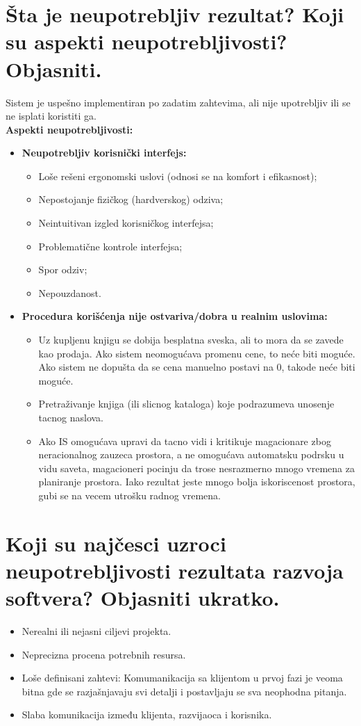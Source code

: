 \documentclass[a4paper]{article}
\begin{document}
\section{Šta je neupotrebljiv rezultat? Koji su aspekti neupotrebljivosti? Objasniti.}
  Sistem je uspešno implementiran po zadatim zahtevima, ali nije upotrebljiv ili se ne isplati
  koristiti ga.\\
  \textbf{Aspekti neupotrebljivosti:}
  \begin{itemize}
    \item \textbf{Neupotrebljiv korisnički interfejs:}
    \begin{itemize}
      \item Loše rešeni ergonomski uslovi (odnosi se na komfort i efikasnost);
      \item Nepostojanje fizičkog (hardverskog) odziva;
      \item Neintuitivan izgled korisničkog interfejsa;
      \item Problematične kontrole interfejsa;
      \item Spor odziv;
      \item Nepouzdanost.
    \end{itemize}
    \item \textbf{Procedura korišćenja nije ostvariva/dobra u realnim uslovima:}
    \begin{itemize}
      \item Uz kupljenu knjigu se dobija besplatna sveska, ali to mora da se zavede kao prodaja. 
            Ako sistem neomogućava promenu cene, to neće biti moguće. 
            Ako sistem ne dopušta da se cena manuelno postavi na 0, takode neće biti moguće.
      \item Pretraživanje knjiga (ili slicnog kataloga) koje podrazumeva unosenje tacnog naslova.
      \item Ako IS omogućava upravi da tacno vidi i kritikuje magacionare zbog neracionalnog zauzeca 
            prostora, a ne omogućava automatsku podrsku u vidu saveta, 
            magacioneri pocinju da trose nesrazmerno mnogo vremena za planiranje prostora. 
            Iako rezultat jeste mnogo bolja iskoriscenost prostora, 
            gubi se na vecem utrošku radnog vremena.
    \end{itemize}
  \end{itemize}

\section{Koji su najčesci uzroci neupotrebljivosti rezultata razvoja softvera? Objasniti ukratko.}
  \begin{itemize}
    \item Nerealni ili nejasni ciljevi projekta.
    \item Neprecizna procena potrebnih resursa.
    \item Loše definisani zahtevi: Komumanikacija sa klijentom u prvoj fazi je veoma bitna gde se
          razjašnjavaju svi detalji i postavljaju se sva neophodna pitanja.
    \item Slaba komunikacija između klijenta, razvijaoca i korisnika.
  \end{itemize}
\end{document}
